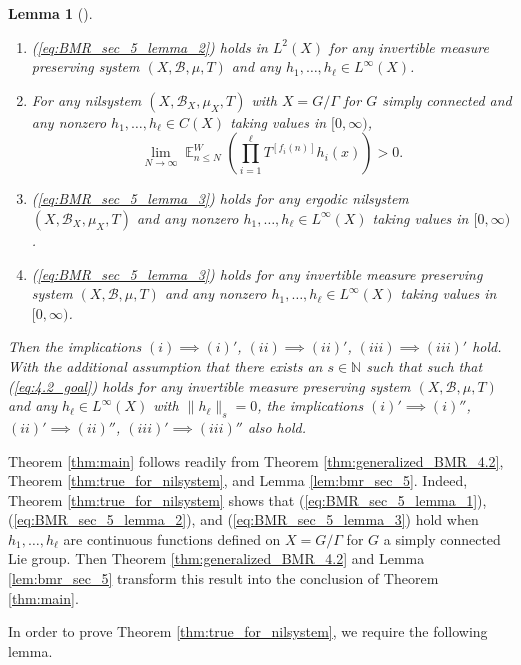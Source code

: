 \documentclass[12pt]{article}
\theoremstyle{plain} %
\newtheorem{lemma}[theorem]{Lemma}
\theoremstyle{definition} %
\theoremstyle{plain}
\theoremstyle{plain}
\numberwithin{equation}{section}
\newcommand{\N}{\mathbb{N}}
\renewcommand{\leq}{\leqslant}
\newcommand{\1}{\mathbbm{1}}
\newcommand{\E}{\operatorname{\mathbb{E}}}
\newcommand{\oo}{\infty}
\newcommand{\round}[1]{[ #1 ]}
\begin{document}
\begin{lemma}[{\cite[Section 5]{BMR24}}]
\begin{enumerate}
       \item[$(ii)''$] (\ref{eq:BMR_sec_5_lemma_2}) holds in $L^2(X)$ for any invertible measure preserving system $(X,\mathscr{B},\mu,T)$ and any $h_1,\dots, h_{\ell}\in L^{\oo}(X)$.
       \item[$(iii)$] For any nilsystem $(X,\mathscr{B}_X,\mu_X,T)$ with $X =G/\Gamma$ for $G$ simply connected and any nonzero $h_1,\dots, h_{\ell}\in C(X)$ taking values in $[0,\oo)$,        \begin{equation}\label{eq:BMR_sec_5_lemma_3}
    \lim_{N\to\oo}\E_{n\leq N}^W\left(\prod_{i=1}^{\ell}T^{\round{f_i(n)}}h_i(x)\right)>0.
       \end{equation}
       \item[$(iii)'$] (\ref{eq:BMR_sec_5_lemma_3}) holds for any ergodic nilsystem $(X,\mathscr{B}_X,\mu_X,T)$ and any nonzero $h_1,\dots, h_{\ell}\in L^{\oo}(X)$ taking values in $[0,\oo)$.
       \item[$(iii)''$] (\ref{eq:BMR_sec_5_lemma_3}) holds for any invertible measure preserving system $(X,\mathscr{B},\mu,T)$ and any nonzero $h_1,\dots, h_{\ell}\in L^{\oo}(X)$ taking values in $[0,\oo)$.
   \end{enumerate}
Then the implications $(i)\implies (i)'$, $(ii)\implies (ii)'$, $(iii)\implies (iii)'$ hold. With the additional assumption that there exists an $s\in \N$ such that such that (\ref{eq:4.2_goal}) holds for any invertible measure preserving system $(X,\mathcal{B},\mu,T)$ and any $h_{\ell}\in L^\infty(X)$ with $\|h_{\ell}\|_s=0$, the implications $(i)'\implies (i)''$, $(ii)'\implies (ii)''$, $(iii)'\implies (iii)''$ also hold.

   
\end{lemma}

Theorem \ref{thm:main} follows readily from Theorem \ref{thm:generalized_BMR_4.2}, Theorem \ref{thm:true_for_nilsystem}, and Lemma \ref{lem:bmr_sec_5}. Indeed, Theorem \ref{thm:true_for_nilsystem} shows that (\ref{eq:BMR_sec_5_lemma_1}), (\ref{eq:BMR_sec_5_lemma_2}), and (\ref{eq:BMR_sec_5_lemma_3}) hold when $h_1,\dots, h_{\ell}$ are continuous functions defined on $X= G/\Gamma$ for $G$ a simply connected Lie group. Then Theorem \ref{thm:generalized_BMR_4.2} and Lemma \ref{lem:bmr_sec_5} transform this result into the conclusion of Theorem \ref{thm:main}.



In order to prove Theorem \ref{thm:true_for_nilsystem}, we require the following lemma.
\end{document}
